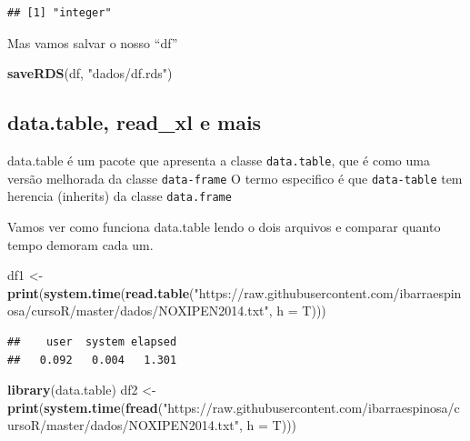 \documentclass[]{book}
\newenvironment{Shaded}{\begin{snugshade}}{\end{snugshade}}
\newcommand{\KeywordTok}[1]{\textcolor[rgb]{0.13,0.29,0.53}{\textbf{#1}}}
\newcommand{\DataTypeTok}[1]{\textcolor[rgb]{0.13,0.29,0.53}{#1}}
\newcommand{\StringTok}[1]{\textcolor[rgb]{0.31,0.60,0.02}{#1}}
\newcommand{\NormalTok}[1]{#1}
\theoremstyle{definition}
\theoremstyle{definition}
\theoremstyle{definition}
\theoremstyle{remark}
\begin{document}
\begin{verbatim}
## [1] "integer"
\end{verbatim}

Mas vamos salvar o nosso ``df''

\begin{Shaded}
\begin{Highlighting}[]
\KeywordTok{saveRDS}\NormalTok{(df, }\StringTok{"dados/df.rds"}\NormalTok{)}
\end{Highlighting}
\end{Shaded}

\subsection{data.table, read\_xl e
mais}\label{data.table-read_xl-e-mais}

data.table é um pacote que apresenta a classe \texttt{data.table}, que é
como uma versão melhorada da classe \texttt{data-frame} O termo
especifico é que \texttt{data-table} tem herencia (inherits) da classe
\texttt{data.frame}

Vamos ver como funciona data.table lendo o dois arquivos e comparar
quanto tempo demoram cada um.

\begin{Shaded}
\begin{Highlighting}[]
\NormalTok{df1 <-}\StringTok{ }\KeywordTok{print}\NormalTok{(}\KeywordTok{system.time}\NormalTok{(}\KeywordTok{read.table}\NormalTok{(}\StringTok{"https://raw.githubusercontent.com/ibarraespinosa/cursoR/master/dados/NOXIPEN2014.txt"}\NormalTok{, }\DataTypeTok{h =}\NormalTok{ T)))}
\end{Highlighting}
\end{Shaded}

\begin{verbatim}
##    user  system elapsed 
##   0.092   0.004   1.301
\end{verbatim}

\begin{Shaded}
\begin{Highlighting}[]
\KeywordTok{library}\NormalTok{(data.table)}
\NormalTok{df2 <-}\StringTok{ }\KeywordTok{print}\NormalTok{(}\KeywordTok{system.time}\NormalTok{(}\KeywordTok{fread}\NormalTok{(}\StringTok{"https://raw.githubusercontent.com/ibarraespinosa/cursoR/master/dados/NOXIPEN2014.txt"}\NormalTok{, }\DataTypeTok{h =}\NormalTok{ T)))}
\end{Highlighting}
\end{Shaded}
\end{document}
